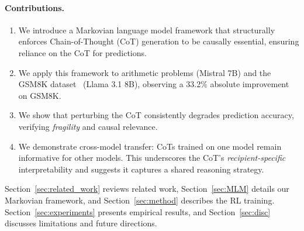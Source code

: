 \documentclass[letterpaper]{article} %
\begin{document}
\paragraph{Contributions.}
\begin{enumerate}
    \item We introduce a Markovian language model framework that structurally enforces Chain-of-Thought (CoT) generation to be causally essential, ensuring reliance on the CoT for predictions.
    \item We apply this framework to arithmetic problems (Mistral 7B) and the GSM8K dataset~\citep{cobbe2021gsm8k} (Llama 3.1 8B), observing a 33.2\% absolute improvement on GSM8K.
    \item We show that perturbing the CoT consistently degrades prediction accuracy, verifying \emph{fragility} and causal relevance.
    \item We demonstrate cross-model transfer: CoTs trained on one model remain informative for other models. This underscores the CoT's \emph{recipient-specific} interpretability and suggests it captures a shared reasoning strategy.
\end{enumerate}

Section~\ref{sec:related_work} reviews related work, Section~\ref{sec:MLM} details our Markovian framework, and Section~\ref{sec:method} describes the RL training. Section~\ref{sec:experiments} presents empirical results, and Section~\ref{sec:disc} discusses limitations and future directions.
\end{document}
